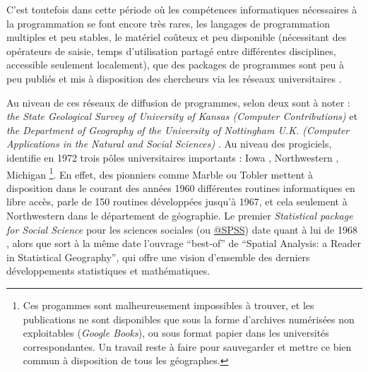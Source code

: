 C'est toutefois dans cette période où les compétences informatiques nécessaires à la programmation se font encore très rares, les langages de programmation multiples et peu stables, le matériel coûteux et peu disponible (nécessitant des opérateurs de saisie, temps d'utilisation partagé entre différentes disciplines, accessible seulement localement), que des packages de programmes sont peu à peu publiés et mis à disposition des chercheurs via les réseaux universitaires \autocite{Haggett1969}. 

Au niveau de ces réseaux de diffusion de programmes, selon \textcite[20-21]{Greer1972} deux sont à noter : \textit{the State Geological Survey of University of Kansas (Computer Contributions)}  et \textit{ the Department of Geography of the University of Nottingham U.K. (Computer Applications in the Natural and Social Sciences) }. Au niveau des progiciels, \textcite[20-21]{Greer1972} identifie en 1972 trois pôles universitaires importants : Iowa \autocite{Wittick1968}, Northwestern \autocite{Marble1967}, Michigan \autocite{Tobler1970c}\footnote{Ces progammes sont malheureusement impossibles à trouver, et les publications ne sont disponibles que sous la forme d'archives numérisées non exploitables (\textit{Google Books}), ou sous format papier dans les universités correspondantes. Un travail reste à faire pour sauvegarder et mettre ce bien commun à disposition de tous les géographes.}. En effet, des pionniers comme Marble ou Tobler mettent à disposition dans le courant des années 1960 différentes routines informatiques en libre accès, \textcite[3]{Marble1967} parle de 150 routines développées jusqu'à 1967, et cela seulement à Northwestern dans le département de géographie. Le premier \textit{Statistical package for Social Science} pour les sciences sociales (ou \href{http://en.wikipedia.org/wiki/SPSS}{@SPSS}) date quant à lui de 1968 \autocite{Barnes2011}, alors que sort à la même date l'ouvrage \foreignquote{english}{best-of} de \textcite{Berry1968} \foreignquote{english}{Spatial Analysis: a Reader in Statistical Geography}, qui offre une vision d'ensemble des derniers développements statistiques et mathématiques.



